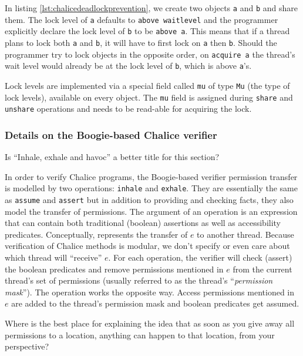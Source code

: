 In listing \ref{lst:chalicedeadlockprevention}, we create two objects \lstinline!a! and \lstinline!b! and share them. 
The lock level of \lstinline!a! defaults to \lstinline!above waitlevel! and the programmer explicitly declare the lock level of \lstinline!b! to be \lstinline!above a!.
This means that if a thread plans to lock both \lstinline!a! and \lstinline!b!, it will have to first lock on \lstinline!a! then \lstinline!b!.
Should the programmer try to lock objects in the opposite order, on \lstinline[language=Chalice]!acquire a! the thread's wait level would already be at the lock level of \lstinline!b!, which is above \lstinline!a!'s.

Lock levels are implemented via a special field called \lstinline!mu! of type \lstinline!Mu! (the type of lock levels), available on every object. 
The \lstinline!mu! field is assigned during \lstinline[language=Chalice]!share! and \lstinline[language=Chalice]!unshare! operations and needs to be read-able for acquiring the lock.

\subsubsection{Details on the Boogie-based Chalice verifier}
\begin{sketch}
Is ``Inhale, exhale and havoc'' a better title for this section?
\end{sketch}

In order to verify Chalice programs, the Boogie-based verifier permission transfer is modelled by two operations: \lstinline[language=SIL]!inhale! and \lstinline[language=SIL]!exhale!. 
They are essentially the same as \lstinline[language=SIL]!assume! and \lstinline[language=SIL]!assert! but in addition to providing and checking facts, they also model the transfer of permissions.
The argument of an \exhale{} operation is an expression that can contain both traditional (boolean) assertions as well as accessibility predicates. 
Conceptually,  represents the transfer of $e$ to another thread. 
Because verification of Chalice methods is modular, we don't specify or even care about which thread will ``receive'' $e$.
For each \exhale operation, the verifier will check (assert) the boolean predicates and remove permissions mentioned in $e$ from the current thread's set of permissions (usually referred to as the thread's ``\emph{permission mask}'').
The  operation works the opposite way. Access permissions mentioned in $e$ are added to the thread's permission mask and boolean predicates get assumed.

\begin{sketch}
Where is the best place for explaining the idea that as soon as you give away all permissions to a location, anything can happen to that location, from your perspective?
\end{sketch}
